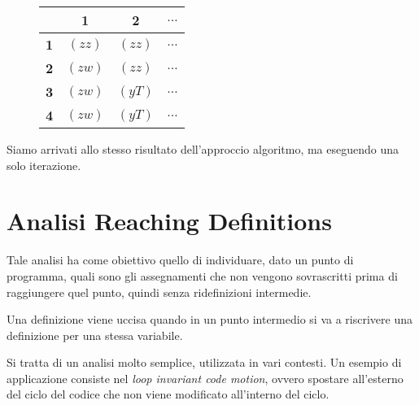 \begin{figure}[H]
    \centering
    \begin{tabular}{|c|c|c|c|}
        \hline
        & \textbf{1} & \textbf{2} & \textbf{$\dots$} \\
        \hline
        \textbf{1} &$(zz)$ & $(zz)$ &  $\dots$ \\
        \hline
        \textbf{2} & $(zw)$ & $(zz)$ & $\dots$ \\
        \hline
        \textbf{3} & $(zw)$ &$(yT)$ & $\dots$ \\
        \hline
        \textbf{4} & $(zw)$ & $(yT)$ & $\dots$ \\
        \hline
    \end{tabular}
\end{figure}
Siamo arrivati allo stesso risultato dell'approccio algoritmo, ma eseguendo una solo iterazione.
\section{Analisi Reaching Definitions}
Tale analisi ha come obiettivo quello di individuare, dato un punto di programma, quali sono gli 
assegnamenti che non vengono sovrascritti prima di raggiungere quel punto, quindi senza ridefinizioni 
intermedie.

\begin{figure}[H]
        \centering 
    \end{figure}

Una definizione viene uccisa quando in un punto intermedio si va a riscrivere una definizione 
per una stessa variabile.

Si tratta di un analisi molto semplice, utilizzata in vari contesti. Un esempio di applicazione consiste 
nel \textit{loop invariant code motion}, ovvero spostare all'esterno del ciclo del codice che non viene
modificato all'interno del ciclo.


